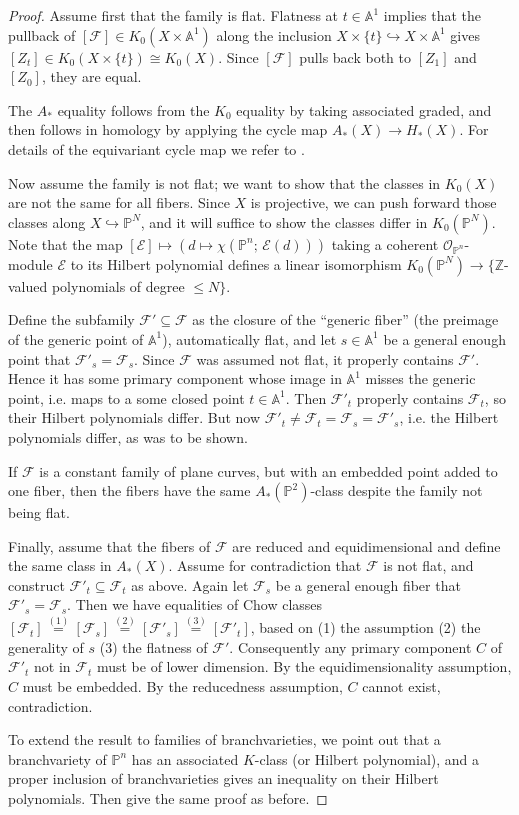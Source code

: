 \documentclass[10pt,a4paper]{amsart}
\newcommand{\ZZ}{\mathbb{Z}}
\newcommand{\PP}{\mathbb{P}}
\def\AA{{\mathbb A }}
\newcommand\calO{{\mathcal O}}
\newcommand\calF{{\mathcal F}}
\newcommand\calE{{\mathcal E}}
\renewcommand\AA{{\mathbb A}}
\newcommand\into\hookrightarrow
\newcommand\iso\cong
\begin{document}
\begin{proof}
  Assume first that the family is flat.
  Flatness at $t \in \AA^1$ implies that the pullback of
  $[\calF] \in K_0(X \times \AA^1)$ along the inclusion
  $X\times \{t\} \into X\times \AA^1$ gives $[Z_t] \in K_0(X\times \{t\})
  \iso K_0(X)$.
  Since $[\calF]$ pulls back both to $[Z_1]$ and $[Z_0]$, they are equal.

  The $A_*$ equality follows from the $K_0$ equality by taking associated
  graded, and then follows in homology by applying the cycle map
  $A_*(X) \to H_*(X)$. For details of the equivariant cycle map we refer
  to \cite{edidin1998equivariant}.

  Now assume the family is not flat; we want to show that the classes
  in $K_0(X)$ are not the same for all fibers. Since $X$ is projective,
  we can push forward those classes along $X\into \PP^N$, and it
  will suffice to show the classes differ in $K_0(\PP^N)$.
  Note that the map $[\calE] \mapsto (d \mapsto \chi(\PP^n;\, \calE(d)))$
  taking a coherent $\calO_{\PP^n}$-module $\calE$ to its
  Hilbert polynomial defines a linear isomorphism
  $K_0(\PP^N) \to \{\ZZ$-valued polynomials of degree $\leq N\}$.

  Define the subfamily $\calF' \subseteq \calF$ as the closure of the
  ``generic fiber'' (the preimage of the generic point of $\AA^1$),
  automatically flat, and let $s\in\AA^1$ be
  a general enough point that $\calF'_s = \calF_s$. 
  Since $\calF$ was assumed not flat,
  it properly contains $\calF'$. Hence it has some primary component
  whose image in $\AA^1$ misses the generic point, i.e. maps to a some
  closed point $t\in \AA^1$.  Then $\calF'_t$ properly contains
  $\calF_t$, so their Hilbert polynomials differ. But now
  $\calF'_t \neq \calF_t = \calF_s = \calF'_s$, i.e. the Hilbert
  polynomials differ, as was to be shown.

  If $\calF$ is a constant family of plane curves, but with an embedded
  point added to one fiber, then the fibers have the same $A_*(\PP^2)$-class
  despite the family not being flat.

  Finally, assume that the fibers of $\calF$ are reduced and equidimensional
  and define the same class in $A_*(X)$. Assume for contradiction that
  $\calF$ is not flat, and construct $\calF'_t \subseteq \calF_t$
  as above. Again let $\calF_s$ be a general enough fiber that
  $\calF'_s = \calF_s$. Then we have equalities of Chow classes
  $[\calF_t] \stackrel{(1)}= [\calF_s] \stackrel{(2)}= [\calF'_s]
  \stackrel{(3)}= [\calF'_t]$, based on (1) the assumption (2) the
  generality of $s$ (3) the flatness of $\calF'$. Consequently any
  primary component $C$ of $\calF'_t$ not in $\calF_t$ must be of lower
  dimension. By the equidimensionality assumption, $C$ must be embedded.
  By the reducedness assumption, $C$ cannot exist, contradiction.

  To extend the result to families of branchvarieties, we point out
  that a branchvariety of $\PP^n$ has an associated $K$-class (or Hilbert
  polynomial), and a proper inclusion of branchvarieties gives an
  inequality on their Hilbert polynomials. Then give the same proof as before.
\end{proof}
\end{document}
